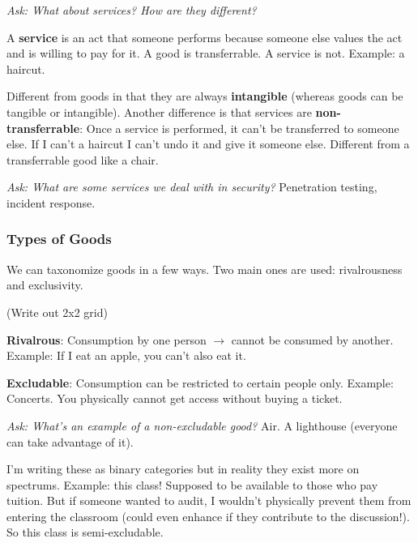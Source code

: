 \documentclass[11pt]{article}
\begin{document}
{\it Ask: What about services? How are they different?}

A {\bf service} is an act that someone performs because someone else values the act and is willing to pay for it. 
A good is transferrable. A service is not. 
Example: a haircut.

Different from goods in that they are always {\bf intangible} (whereas goods can be tangible or intangible). 
Another difference is that services are {\bf non-transferrable}: Once a service is performed, it can't be transferred to someone else. 
If I can't a haircut I can't undo it and give it someone else.
Different from a transferrable good like a chair.

{\it Ask: What are some services we deal with in security?} Penetration testing, incident response. 

\subsubsection{Types of Goods}

We can taxonomize goods in a few ways.
Two main ones are used: rivalrousness and exclusivity.

(Write out 2x2 grid)

{\bf Rivalrous}: Consumption by one person $\rightarrow$ cannot be consumed by another.
Example: If I eat an apple, you can't also eat it.  

{\bf Excludable}: Consumption can be restricted to certain people only. 
Example: Concerts. You physically cannot get access without buying a ticket.

{\it Ask: What's an example of a non-excludable good?} Air. A lighthouse (everyone can take advantage of it).

I'm writing these as binary categories but in reality they exist more on spectrums.
Example: this class! Supposed to be available to those who pay tuition. But if someone wanted to audit, I wouldn't physically prevent them from entering the classroom (could even enhance if they contribute to the discussion!). So this class is semi-excludable.
\end{document}
